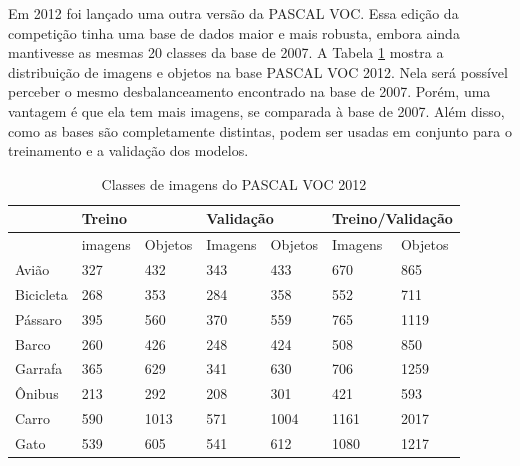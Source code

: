 Em 2012 foi lançado uma outra versão da \ac{PASCAL VOC}. Essa edição da competição tinha uma base de dados maior e mais robusta, embora ainda mantivesse as mesmas 20 classes da base de 2007. A Tabela \ref{tab:voc2012} mostra a distribuição de imagens e objetos na base \ac{PASCAL VOC} 2012. Nela será possível perceber o mesmo desbalanceamento encontrado na base de 2007. Porém, uma vantagem é que ela tem mais imagens, se comparada à base de 2007. Além disso, como as bases são completamente distintas, podem ser usadas em conjunto para o treinamento e a validação dos modelos.

\begin{table}[H]
	\centering
	\footnotesize
	\setlength{\abovecaptionskip}{0pt}
	\setlength{\belowcaptionskip}{0pt}
	\caption[Pascal VOC 2012]{Classes de imagens do PASCAL VOC 2012}
	\label{tab:voc2012}
	\begin{tabular}{l|l|l|l|l|l|l}
		& \multicolumn{2}{l|}{Treino} & \multicolumn{2}{l|}{Validação} & \multicolumn{2}{l}{Treino/Validação} \\ \hline
		& imagens      & Objetos      & Imagens        & Objetos       & Imagens           & Objetos           \\ \hline
		Avião          & 327          & 432          & 343            & 433           & 670               & 865               \\
		Bicicleta      & 268          & 353          & 284            & 358           & 552               & 711               \\
		Pássaro        & 395          & 560          & 370            & 559           & 765               & 1119              \\
		Barco          & 260          & 426          & 248            & 424           & 508               & 850               \\
		Garrafa        & 365          & 629          & 341            & 630           & 706               & 1259              \\
		Ônibus         & 213          & 292          & 208            & 301           & 421               & 593               \\
		Carro          & 590          & 1013         & 571            & 1004          & 1161              & 2017              \\
		Gato           & 539          & 605          & 541            & 612           & 1080              & 1217              \\

\end{tabular}
\end{table}
